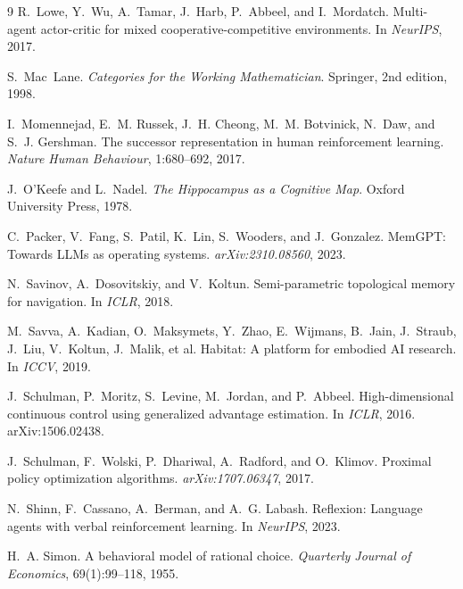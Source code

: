 \documentclass{article}
\begin{document}
{\begin{thebibliography}{9}
R.~Lowe, Y.~Wu, A.~Tamar, J.~Harb, P.~Abbeel, and I.~Mordatch.
\newblock Multi-agent actor-critic for mixed cooperative-competitive environments.
\newblock In \emph{NeurIPS}, 2017.

S.~Mac~Lane.
\newblock \emph{Categories for the Working Mathematician}.
\newblock Springer, 2nd edition, 1998.

I.~Momennejad, E.~M. Russek, J.~H. Cheong, M.~M. Botvinick, N.~Daw, and S.~J. Gershman.
\newblock The successor representation in human reinforcement learning.
\newblock \emph{Nature Human Behaviour}, 1:680--692, 2017.

J.~O'Keefe and L.~Nadel.
\newblock \emph{The Hippocampus as a Cognitive Map}.
\newblock Oxford University Press, 1978.

C.~Packer, V.~Fang, S.~Patil, K.~Lin, S.~Wooders, and J.~Gonzalez.
\newblock MemGPT: Towards LLMs as operating systems.
\newblock \emph{arXiv:2310.08560}, 2023.

N.~Savinov, A.~Dosovitskiy, and V.~Koltun.
\newblock Semi-parametric topological memory for navigation.
\newblock In \emph{ICLR}, 2018.

M.~Savva, A.~Kadian, O.~Maksymets, Y.~Zhao, E.~Wijmans, B.~Jain, J.~Straub, J.~Liu, V.~Koltun, J.~Malik, et al.
\newblock Habitat: A platform for embodied AI research.
\newblock In \emph{ICCV}, 2019.

J.~Schulman, P.~Moritz, S.~Levine, M.~Jordan, and P.~Abbeel.
\newblock High-dimensional continuous control using generalized advantage estimation.
\newblock In \emph{ICLR}, 2016.
\newblock arXiv:1506.02438.

J.~Schulman, F.~Wolski, P.~Dhariwal, A.~Radford, and O.~Klimov.
\newblock Proximal policy optimization algorithms.
\newblock \emph{arXiv:1707.06347}, 2017.

N.~Shinn, F.~Cassano, A.~Berman, and A.~G. Labash.
\newblock Reflexion: Language agents with verbal reinforcement learning.
\newblock In \emph{NeurIPS}, 2023.

H.~A. Simon.
\newblock A behavioral model of rational choice.
\newblock \emph{Quarterly Journal of Economics}, 69(1):99--118, 1955.


\end{thebibliography}}
\end{document}
